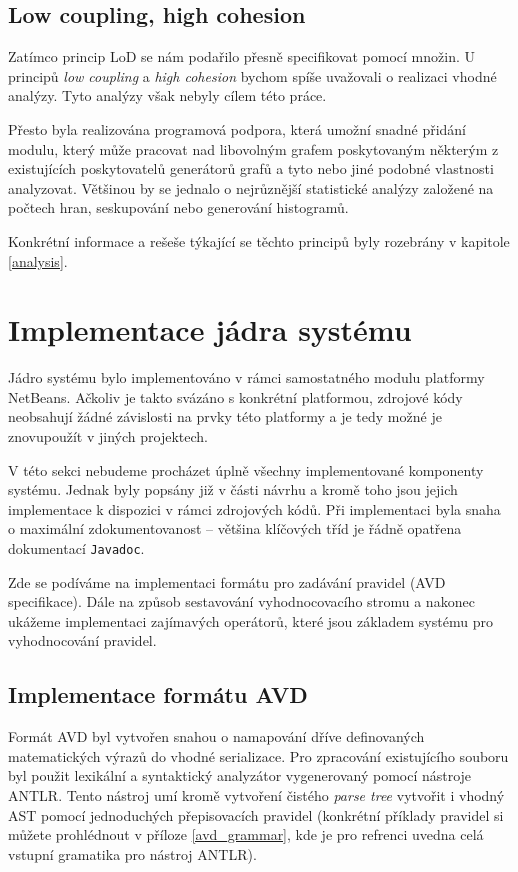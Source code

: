 \subsection{Low coupling, high cohesion}
Zatímco princip LoD se nám podařilo přesně specifikovat pomocí množin. U principů \emph{low coupling} a \emph{high cohesion} bychom spíše uvažovali o realizaci vhodné analýzy. Tyto analýzy však nebyly cílem této práce.

Přesto byla realizována programová podpora, která umožní snadné přidání modulu, který může pracovat nad libovolným grafem poskytovaným některým z existujících poskytovatelů generátorů grafů a tyto nebo jiné podobné vlastnosti analyzovat. Většinou by se jednalo o nejrůznější statistické analýzy založené na počtech hran, seskupování nebo generování histogramů.

Konkrétní informace a rešeše týkající se těchto principů byly rozebrány v kapitole \ref{analysis}.

\section{Implementace jádra systému}
Jádro systému bylo implementováno v rámci samostatného modulu platformy NetBeans. Ačkoliv je takto svázáno s konkrétní platformou, zdrojové kódy neobsahují žádné závislosti na prvky této platformy a je tedy možné je znovupoužít v jiných projektech.

V této sekci nebudeme procházet úplně všechny implementované komponenty systému. Jednak byly popsány již v části návrhu a kromě toho jsou jejich implementace k dispozici v rámci zdrojových kódů. Při implementaci byla snaha o maximální zdokumentovanost -- většina klíčových tříd je řádně opatřena dokumentací \verb-Javadoc-.

Zde se podíváme na implementaci formátu pro zadávání pravidel (AVD specifikace). Dále na způsob sestavování vyhodnocovacího stromu a nakonec ukážeme implementaci zajímavých operátorů, které jsou základem systému pro vyhodnocování pravidel.

\subsection{Implementace formátu AVD}
Formát AVD byl vytvořen snahou o namapování dříve definovaných matematických výrazů do vhodné serializace. Pro zpracování existujícího souboru byl použit lexikální a syntaktický analyzátor vygenerovaný pomocí nástroje ANTLR. Tento nástroj umí kromě vytvoření čistého \emph{parse tree} vytvořit i vhodný AST pomocí jednoduchých přepisovacích pravidel (konkrétní příklady pravidel si můžete prohlédnout v příloze \ref{avd_grammar}, kde je pro refrenci uvedna celá vstupní gramatika pro nástroj ANTLR).

